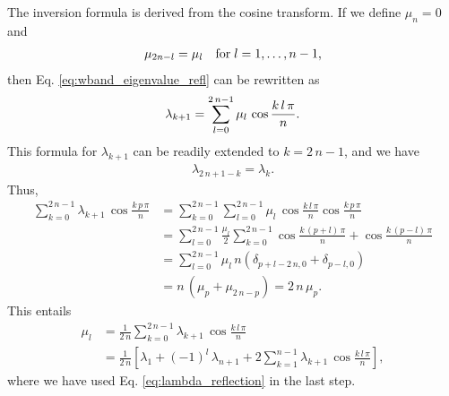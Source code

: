 \documentclass[reprint, floatfix]{revtex4-1}
\begin{document}
{The inversion formula is derived from the cosine transform.
  If we define $\mu_n = 0$ and
  \begin{align}
    \mu_{ 2 n - l } = \mu_l
    \quad
    \mathrm{for\;} l = 1, \dots, n - 1,
  \notag
  \end{align}
  then Eq. \eqref{eq:wband_eigenvalue_refl} can be rewritten as
  \begin{align}
    \lambda_{k+1}
    =
    \sum_{ l = 0 }^{ 2 \, n - 1 }
    \mu_l \, \cos \frac{ k \, l \, \pi } { n }.
  \notag
  \end{align}
  This formula for $\lambda_{k+1}$
  can be readily extended to $k = 2 \, n - 1$,
  and we have
  \begin{align}
    \lambda_{ 2 \, n + 1 - k } = \lambda_k.
    \label{eq:lambda_reflection}
  \end{align}
  Thus,
  $$
  \begin{aligned}
    \sum_{ k = 0 }^{ 2 \, n - 1 }
      \lambda_{ k + 1 } \,
      \cos \frac{ k \, p \, \pi }
                {      n        }
    &=
    \sum_{ k = 0 }^{ 2 \, n - 1 }
      \sum_{ l = 0 }^{ 2 \, n - 1 }
        \mu_l \,
        \cos \frac{ k \, l \, \pi }
                  {      n        }
        \cos \frac{ k \, p \, \pi }
                  {      n        }
    \\
    &=
    \sum_{ l = 0 }^{ 2 \, n - 1 }
      \frac{ \mu_l } { 2 }
      \sum_{ k = 0 }^{ 2 \, n - 1 }
        \cos \frac{ k \, (p + l) \, \pi }
                  {      n        }
                  +
        \cos \frac{ k \, (p - l) \, \pi }
                  {      n        }
    \\
    &=
    \sum_{ l = 0 }^{ 2 \, n - 1 }
      \mu_l \, n \left(
        \delta_{ p + l - 2 \, n, 0 }
        +
        \delta_{ p - l, 0 }
      \right)
    \\
    &=
    n \, \left( \mu_p + \mu_{ 2 \, n - p} \right)
    =
    2 \, n \, \mu_p.
  \end{aligned}
  $$
  This entails
  $$
  \begin{aligned}
    \mu_l
    &=
    \frac{    1   }
         { 2 \, n }
    \sum_{ k = 0 }^{ 2 \, n - 1 }
      \lambda_{ k + 1 } \,
      \cos \frac{ k \, l \, \pi }
                {      n        }
              \\
    &=
    \frac{    1   }
         { 2 \, n }
    \left[
      \lambda_1
      +
      (-1)^l \, \lambda_{n + 1}
      +
      2 \sum_{ k = 1 }^{ n - 1 }
        \lambda_{ k + 1 } \,
        \cos \frac{ k \, l \, \pi }
                  {      n        }
    \right],
  \end{aligned}
  $$
  where we have used Eq. \eqref{eq:lambda_reflection}
  in the last step.

}
\end{document}
